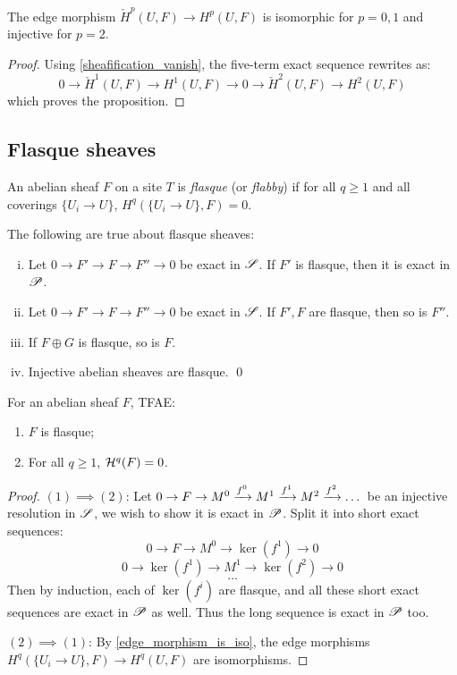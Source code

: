 \documentclass[11pt]{amsart}
\begin{document}
\begin{prop}
    The edge morphism $\check{H}^p(U,F)\to H^p(U,F)$ is isomorphic for $p=0,1$ and injective for $p=2$.
\end{prop}

\begin{proof}
    Using \ref{sheafification_vanish},  the five-term exact sequence rewrites as:
    \[0\to \check{H}^1(U, F) \to H^1(U,F) \to 0 \to \check{H}^2(U, F) \to H^2(U,F)\]
    which proves the proposition.
\end{proof}


\subsection{Flasque sheaves}

\begin{defn}
    An abelian sheaf $F$ on a site $T$ is \emph{flasque} (or \emph{flabby}) if for all $q\ge 1$ and all coverings $\{U_i\to U\}$, $H^q(\{U_i\to U\}, F) = 0$.
\end{defn}

\begin{prop}
    The following are true about flasque sheaves:
    \begin{enumerate}[(i)]
        \item Let $0\to F'\to F\to F''\to 0$ be exact in $\mathscr{S}$. If $F'$ is flasque, then it is exact in $\mathscr{P}$.
        \item Let $0\to F'\to F\to F''\to 0$ be exact in $\mathscr{S}$. If $F',F$ are flasque, then so is $F''$.
        \item If $F\oplus G$ is flasque, so is $F$.
        \item Injective abelian sheaves are flasque. \qed
    \end{enumerate}
\end{prop}

\begin{cor}
    For an abelian sheaf $F$, TFAE:
    \begin{enumerate}
        \item $F$ is flasque;
        \item For all $q\ge 1$, $\mathcal{H}^q(F) = 0$.
    \end{enumerate}
\end{cor}

\begin{proof}
    $(1)\implies (2)$: Let $0\to F\to M^0 \xrightarrow{f^0} M^1 \xrightarrow{f^1} M^2 \xrightarrow{f^2}\dots$ be an injective resolution in $\mathscr{S}$, we wish to show it is exact in $\mathscr{P}$. Split it into short exact sequences:
    \[0\to F\to M^0 \to \ker(f^1) \to 0\]
    \[0\to \ker(f^1) \to M^1 \to \ker(f^2) \to 0\]
    \[\dots\]
    Then by induction, each of $\ker(f^i)$ are flasque, and all these short exact sequences are exact in $\mathscr{P}$ as well. Thus the long sequence is exact in $\mathscr{P}$ too.

    $(2)\implies (1)$: By \ref{edge_morphism_is_iso}, the edge morphisms $H^q(\{U_i\to U\}, F)\to H^q(U, F)$ are isomorphisms.
\end{proof}
\end{document}
